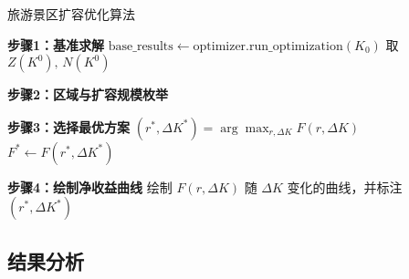 \begin{algorithm}[H]\small
  \renewcommand{\algorithmcfname}{算法}
  \caption{旅游景区扩容优化算法}


  \textbf{步骤1：基准求解}\;
  $\text{base\_results}\leftarrow\text{optimizer.run\_optimization}(K_0)$\;
  取 $Z(K^0),\,N(K^0)$\;

  \textbf{步骤2：区域与扩容规模枚举}\;

  \textbf{步骤3：选择最优方案}\;
  $(r^*,\Delta K^*) = \arg\max_{r,\Delta K} F(r,\Delta K)$\;
  $F^* \leftarrow F(r^*,\Delta K^*)$\;

  \textbf{步骤4：绘制净收益曲线}\;
  绘制 $F(r,\Delta K)$ 随 $\Delta K$ 变化的曲线，并标注 $(r^*,\Delta K^*)$\;

  \label{algorithm:expansion_optimization}
\end{algorithm}

\subsection[\hspace{-2pt}结果分析]{{\heiti{}\hspace{-8pt}结果分析}}\label{subsec:3-model-build}
